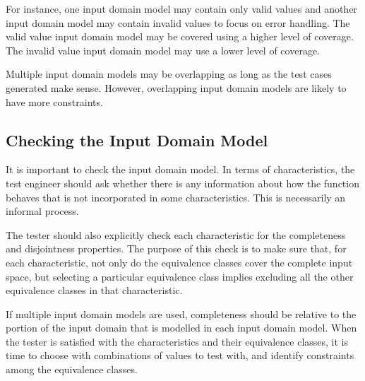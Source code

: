 For instance, one input domain model may contain only valid values and another
input domain model may contain invalid values to focus on error handling. The
valid value input domain model may be covered using a higher level of coverage.
The invalid value input domain model may use a lower level of coverage. 

Multiple input domain models may be overlapping as long as the test cases
generated make sense. However, overlapping input domain models are likely to
have more constraints.

\subsection{Checking the Input Domain Model}

It is important to check the input domain model. In terms of characteristics,
the test engineer should ask whether there is any information about how the
function behaves that is not incorporated in some characteristics. This is
necessarily an informal process.

The tester should also explicitly check each characteristic for the completeness
and disjointness properties. The purpose of this check is to make sure that, for
each characteristic, not only do the equivalence classes cover the complete
input space, but selecting a particular equivalence class implies excluding all
the other equivalence classes in that characteristic. 

If multiple input domain models are used, completeness should be relative to the
portion of the input domain that is modelled in each input domain model. When
the tester is satisfied with the characteristics and their equivalence classes,
it is time to choose with combinations of values to test with, and identify
constraints among the equivalence classes.



